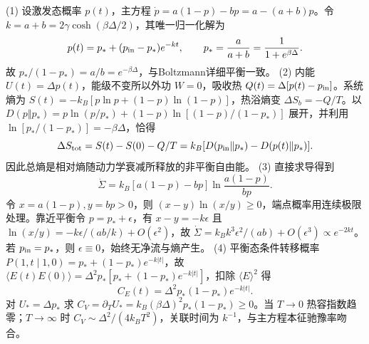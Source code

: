 (1) 设激发态概率 \(p(t)\)，主方程 \(\dot p=a(1-p)-bp=a-(a+b)p\)。令 \(k=a+b=2\gamma\cosh(\beta\Delta/2)\)，其唯一归一化解为
\[
p(t)=p_*+(p_{\rm in}-p_*)e^{-kt},\qquad
p_*=\frac a{a+b}=\frac1{1+e^{\beta\Delta}}.
\]
故 \(p_*/(1-p_*)=a/b=e^{-\beta\Delta}\)，与Boltzmann详细平衡一致。
(2) 内能 \(U(t)=\Delta p(t)\)，能级不变所以外功 \(W=0\)，吸收热 \(Q(t)=\Delta[p(t)-p_{\rm in}]\)。系统熵为 \(S(t)=-k_B[p\ln p+(1-p)\ln(1-p)]\)，热浴熵变 \(\Delta S_b=-Q/T\)。以 \(D(p\Vert p_*)=p\ln(p/p_*)+(1-p)\ln[(1-p)/(1-p_*)]\) 展开，并利用 \(\ln[p_*/(1-p_*)]=-\beta\Delta\)，恰得
\[
\Delta S_{\rm tot}=S(t)-S(0)-Q/T
=k_B[D(p_{\rm in}\Vert p_*)-D(p(t)\Vert p_*)].
\]
因此总熵是相对熵随动力学衰减所释放的非平衡自由能。
(3) 直接求导得到
\[
\dot\Sigma=k_B[a(1-p)-bp]\ln\frac{a(1-p)}{bp}.
\]
令 \(x=a(1-p),y=bp>0\)，则 \((x-y)\ln(x/y)\ge0\)，端点概率用连续极限处理。靠近平衡令 \(p=p_*+\epsilon\)，有 \(x-y=-k\epsilon\) 且 \(\ln(x/y)=-k\epsilon/(ab/k)+O(\epsilon^2)\)，故 \(\dot\Sigma=k_Bk^3\epsilon^2/(ab)+O(\epsilon^3)\propto e^{-2kt}\)。若 \(p_{\rm in}=p_*\)，则 \(\epsilon\equiv0\)，始终无净流与熵产生。
(4) 平衡态条件转移概率 \(P(1,t\mid1,0)=p_*+(1-p_*)e^{-k|t|}\)，故 \(\langle E(t)E(0)\rangle=\Delta^2p_*[p_*+(1-p_*)e^{-k|t|}]\)，扣除 \(\langle E\rangle^2\) 得
\[
C_E(t)=\Delta^2p_*(1-p_*)e^{-k|t|}.
\]
对 \(U_*=\Delta p_*\) 求 \(C_V=\partial_TU_*=
k_B(\beta\Delta)^2p_*(1-p_*)\ge0\)。当 \(T\to0\) 热容指数趋零；\(T\to\infty\) 时 \(C_V\sim\Delta^2/(4k_BT^2)\)，关联时间为 \(k^{-1}\)，与主方程本征驰豫率吻合。
